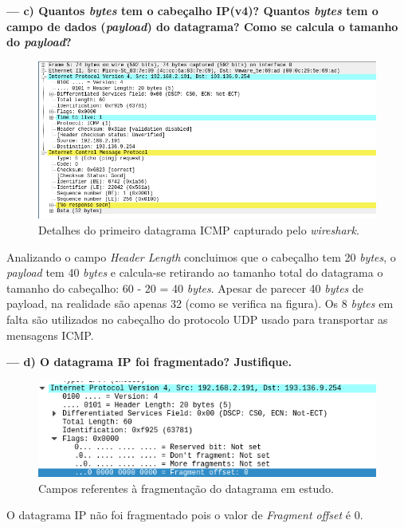 \documentclass[a4paper]{article}
\begin{document}
\textbf{--- c) Quantos \textit{bytes} tem o cabeçalho IP(v4)? Quantos \textit{bytes} tem o campo de dados (\textit{payload}) do datagrama? Como se calcula o tamanho do \textit{payload}?}\newline
\begin{figure}[ht]
    \centering
    \includegraphics[scale=0.5]{datagrama-inicial.png}
    \caption{Detalhes do primeiro datagrama ICMP capturado pelo \textit{wireshark}.}
    \label{fig:my_label}
\end{figure}
Analizando o campo \textit{Header Length} concluimos que o cabeçalho tem 20 \textit{bytes}, o \textit{payload} tem 40 \textit{bytes} e calcula-se retirando ao tamanho total do datagrama o tamanho do cabeçalho: 60 - 20 = 40 \textit{bytes}. Apesar de parecer 40 \textit{bytes} de payload, na realidade são apenas 32 (como se verifica na figura). Os 8 \textit{bytes} em falta são utilizados no cabeçalho do protocolo UDP usado para transportar as mensagens ICMP.

\vspace{1cm}

\textbf{--- d) O datagrama IP foi fragmentado? Justifique.}\newline
\begin{figure}[!htb]
    \centering
    \includegraphics[scale=0.7]{pic9.png}\newline
    \caption{Campos referentes à fragmentação do datagrama em estudo.}
    \label{fig:my_label}
\end{figure}
O datagrama IP não foi fragmentado pois o valor de \textit{Fragment offset} é 0.
\end{document}
